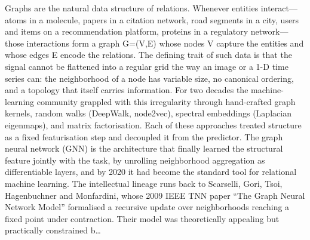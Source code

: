 Graphs are the natural data structure of relations. Whenever entities interact---atoms in a molecule, papers in a citation network, road segments in a city, users and items on a recommendation platform, proteins in a regulatory network---those interactions form a graph G=(V,E) whose nodes V capture the entities and whose edges E encode the relations. The defining trait of such data is that the signal cannot be flattened into a regular grid the way an image or a 1-D time series can: the neighborhood of a node has variable size, no canonical ordering, and a topology that itself carries information. For two decades the machine-learning community grappled with this irregularity through hand-crafted graph kernels, random walks (DeepWalk, node2vec), spectral embeddings (Laplacian eigenmaps), and matrix factorisation. Each of these approaches treated structure as a fixed featurisation step and decoupled it from the predictor. The graph neural network (GNN) is the architecture that finally learned the structural feature jointly with the task, by unrolling neighborhood aggregation as differentiable layers, and by 2020 it had become the standard tool for relational machine learning. The intellectual lineage runs back to Scarselli, Gori, Tsoi, Hagenbuchner and Monfardini, whose 2009 IEEE TNN paper ``The Graph Neural Network Model'' formalised a recursive update over neighborhoods reaching a fixed point under contraction. Their model was theoretically appealing but practically constrained b\ldots{}
